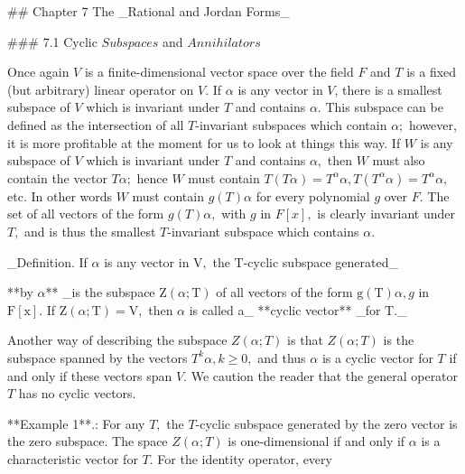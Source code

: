 

## Chapter 7 The _Rational and Jordan Forms_

### 7.1 Cyclic \(Subspaces\) and \(Annihilators\)

Once again \(V\) is a finite-dimensional vector space over the field \(F\) and \(T\) is a fixed (but arbitrary) linear operator on \(V.\) If \(\alpha\) is any vector in \(V\), there is a smallest subspace of \(V\) which is invariant under \(T\) and contains \(\alpha.\) This subspace can be defined as the intersection of all \(T\)-invariant subspaces which contain \(\alpha;\) however, it is more profitable at the moment for us to look at things this way. If \(W\) is any subspace of \(V\) which is invariant under \(T\) and contains \(\alpha,\) then \(W\) must also contain the vector \(T\alpha;\) hence \(W\) must contain \(T(T\alpha)=T^{\alpha}\alpha,\)\(T(T^{\alpha}\alpha)=T^{\alpha}\alpha,\) etc. In other words \(W\) must contain \(g(T)\alpha\) for every polynomial \(g\) over \(F.\) The set of all vectors of the form \(g(T)\alpha,\) with \(g\) in \(F[x],\) is clearly invariant under \(T,\) and is thus the smallest \(T\)-invariant subspace which contains \(\alpha.\)

_Definition. If \(\alpha\) is any vector in \(\mathrm{V},\) the \(\mathrm{T}\)-cyclic subspace generated_

**by \(\alpha\)** _is the subspace \(\mathrm{Z}(\alpha;\mathrm{T})\) of all vectors of the form \(\mathrm{g(T)}\alpha,\)\(g\) in \(\mathrm{F[x]}.\) If \(\mathrm{Z}(\alpha;\mathrm{T})=\mathrm{V},\) then \(\alpha\) is called a_ **cyclic vector** _for \(\mathrm{T}.\)_

Another way of describing the subspace \(Z(\alpha;T)\) is that \(Z(\alpha;T)\) is the subspace spanned by the vectors \(T^{k}\alpha,\)\(k\geq 0,\) and thus \(\alpha\) is a cyclic vector for \(T\) if and only if these vectors span \(V.\) We caution the reader that the general operator \(T\) has no cyclic vectors.

**Example 1**.: For any \(T,\) the \(T\)-cyclic subspace generated by the zero vector is the zero subspace. The space \(Z(\alpha;T)\) is one-dimensional if and only if \(\alpha\) is a characteristic vector for \(T.\) For the identity operator, every